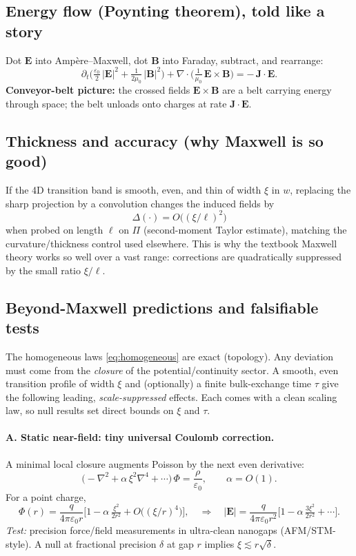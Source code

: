 \subsection{Energy flow (Poynting theorem), told like a story}
Dot $\mathbf E$ into Amp\`ere–Maxwell, dot $\mathbf B$ into Faraday, subtract, and rearrange:
\[
\partial_t \Big(\tfrac{\varepsilon_0}{2}\,|\mathbf E|^2 + \tfrac{1}{2\mu_0}\,|\mathbf B|^2\Big)
+ \nabla\!\cdot\!\Big(\tfrac{1}{\mu_0}\,\mathbf E\times \mathbf B\Big)
= -\,\mathbf J\!\cdot\!\mathbf E.
\]
\textbf{Conveyor-belt picture:} the crossed fields $\mathbf E\times\mathbf B$ are a belt carrying energy through space; the belt unloads onto charges at rate $\mathbf J\!\cdot\!\mathbf E$.

\subsection{Thickness and accuracy (why Maxwell is so good)}
If the 4D transition band is smooth, even, and thin of width $\xi$ in $w$, replacing the sharp projection by a convolution changes the induced fields by
\[
\Delta(\cdot)=O\!\big((\xi/\ell)^2\big)
\]
when probed on length $\ell$ on $\Pi$ (second-moment Taylor estimate), matching the curvature/thickness control used elsewhere. This is why the textbook Maxwell theory works so well over a vast range: corrections are quadratically suppressed by the small ratio $\xi/\ell$.

\subsection{Beyond-Maxwell predictions and falsifiable tests}
\label{subsec:EM_predictions}
The homogeneous laws \eqref{eq:homogeneous} are exact (topology). Any deviation must come from the \emph{closure} of the potential/continuity sector. A smooth, even transition profile of width $\xi$ and (optionally) a finite bulk-exchange time $\tau$ give the following leading, \emph{scale-suppressed} effects. Each comes with a clean scaling law, so null results set direct bounds on $\xi$ and $\tau$.

\paragraph{A. Static near-field: tiny universal Coulomb correction.}
A minimal local closure augments Poisson by the next even derivative:
\begin{equation}
\big(-\nabla^2 + \alpha\,\xi^2 \nabla^4 + \cdots\big)\,\Phi
=\frac{\rho}{\varepsilon_0},\qquad \alpha=O(1).
\end{equation}
For a point charge,
\begin{equation}
\Phi(r)=\frac{q}{4\pi\varepsilon_0 r}
\Big[1-\alpha\,\tfrac{\xi^2}{2r^2}+O\big((\xi/r)^4\big)\Big],
\quad
\Rightarrow\quad
|\mathbf E|=\frac{q}{4\pi\varepsilon_0 r^2}\Big[1-\alpha\,\tfrac{3\xi^2}{2r^2}+\cdots\Big].
\end{equation}
\emph{Test:} precision force/field measurements in ultra-clean nanogaps (AFM/STM-style). A null at fractional precision $\delta$ at gap $r$ implies $\xi \lesssim r\sqrt{\delta}$.

